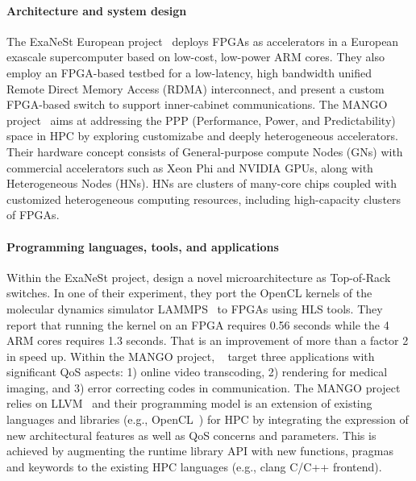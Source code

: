 \paragraph{Architecture and system design}
    The %
    ExaNeSt European project~\cite{Katevenis2018NextDevelopment} deploys FPGAs %
    as accelerators in %
    a European 
    exascale supercomputer based on low-cost, low-power %
    ARM cores. They also employ an FPGA-based testbed for a low-latency, high bandwidth unified Remote Direct Memory Access (RDMA) interconnect, and present %
    a custom FPGA-based switch to support inner-cabinet communications.
   The MANGO project~\cite{Flich2018ExploringApproach} aims at addressing the PPP (Performance, Power, and Predictability) space in HPC %
   by exploring %
   customizabe and deeply heterogeneous accelerators. Their hardware concept consists of General-purpose compute Nodes (GNs) with %
   commercial accelerators such as Xeon Phi and NVIDIA GPUs, along with Heterogeneous Nodes (HNs). HNs are clusters of many-core chips coupled with customized heterogeneous computing resources, including high-capacity clusters of FPGAs.
    
\paragraph{Programming languages, tools, and applications}
    Within the ExaNeSt project, \citet{Katevenis2018NextDevelopment} %
    design a novel microarchitecture as Top-of-Rack switches. In one of their experiment, they port the OpenCL kernels of the molecular dynamics simulator LAMMPS~\cite{plimpton1995fast} to FPGAs using HLS tools. 
    They report that running the kernel on an FPGA requires 0.56 seconds while the 4 ARM cores requires 1.3 seconds. That is an improvement of more than a factor 2 in speed up.
    Within the MANGO project, ~\citet{Flich2018ExploringApproach} target three applications with significant QoS aspects: 1) online video transcoding, 2) rendering for medical imaging, and 3) error correcting codes in communication. The MANGO project relies on LLVM~\cite{lattner2004llvm} and their programming model is an extension of %
    existing languages and libraries (e.g., OpenCL~\cite{opencl}) for HPC by integrating the expression of new architectural features as well as QoS concerns and parameters. This is achieved %
    by augmenting the runtime library API with new functions, pragmas and keywords to the existing HPC languages (e.g., clang C/C++ frontend). 
    
